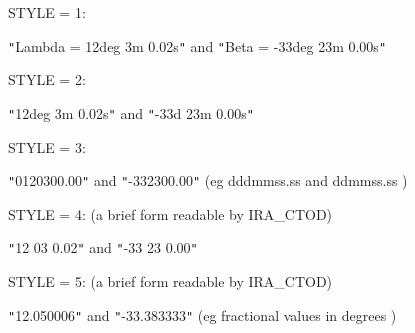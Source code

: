 {{      
         STYLE = 1:

            {\tt "}Lambda = 12deg 3m 0.02s{\tt "} and  {\tt "}Beta = -33deg 23m 0.00s{\tt "}

         STYLE = 2:

            {\tt "}12deg 3m 0.02s{\tt "} and {\tt "}-33d 23m 0.00s{\tt "}

         STYLE = 3:

            {\tt "}0120300.00{\tt "} and {\tt "}-332300.00{\tt "} (eg dddmmss.ss and ddmmss.ss )

         STYLE = 4:  (a brief form readable by IRA\_CTOD)

            {\tt "}12 03 0.02{\tt "} and {\tt "}-33 23 0.00{\tt "}

         STYLE = 5:  (a brief form readable by IRA\_CTOD)

            {\tt "}12.050006{\tt "} and {\tt "}-33.383333{\tt "} (eg fractional values in
                                         degrees )
   }
}
